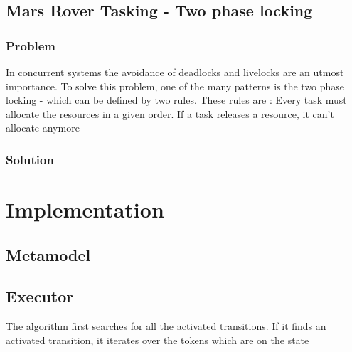 		
		
		\subsection{Mars Rover Tasking - Two phase locking}
			\subsubsection{Problem}
				In concurrent systems the avoidance of deadlocks and livelocks are an utmost importance.
				To solve this problem, one of the many patterns is  the two phase locking - which can be defined by two rules.
				These rules are : 
					Every task must allocate the resources in a given order.
					If a task releases a resource, it can't allocate anymore
			\subsubsection{Solution}

	\section{Implementation}
		\subsection{Metamodel}
		\subsection{Executor}
			The algorithm first searches for all the activated transitions.
			If it finds an activated transition, it iterates over the tokens which are on the state 
